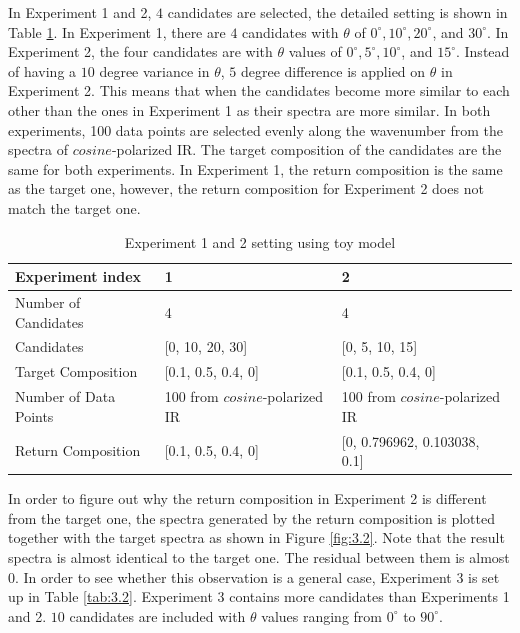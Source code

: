In Experiment 1 and 2, $4$ candidates are selected, the detailed setting is shown in Table \ref{tab:3.1}. In Experiment 1, there are $4$ candidates with $\theta$ of $0^{\circ}, 10^{\circ}, 20^{\circ}$, and $30^{\circ}$. In Experiment 2, the four candidates are with $\theta$ values of $0^{\circ}, 5^{\circ}, 10^{\circ}$, and $15^{\circ}$. Instead of having a $10$ degree variance in $\theta$, $5$ degree difference is applied on $\theta$ in Experiment 2. This means that when the candidates become more similar to each other than the ones in Experiment 1 as their spectra are more similar. In both experiments, 100 data points are selected evenly along the wavenumber from the spectra of $cosine$-polarized IR. The target composition of the candidates are the same for both experiments. In Experiment 1, the return composition is the same as the target one, however, the return composition for Experiment 2 does not match the target one. \\

\begin{table} 
\begin{center}
\begin{tabular}{| l | l | l | }
\hline
Experiment index & 1 & 2  \\
\hline
Number of Candidates & 4 & 4  \\
\hline
Candidates & [0, 10, 20, 30] & [0, 5, 10, 15] \\
\hline
Target Composition & [0.1, 0.5, 0.4, 0] & [0.1, 0.5, 0.4, 0]     \\
\hline
Number of Data Points & 100 from $cosine$-polarized IR &  100 from $cosine$-polarized IR     \\
\hline
Return Composition & [0.1, 0.5, 0.4, 0] & [0, 0.796962, 0.103038, 0.1] \\
\hline
\end{tabular} 
\end{center}
\caption{Experiment 1 and 2 setting using toy model}
\label{tab:3.1}
\end{table}	

In order to figure out why the return composition in Experiment 2 is different from the target one, the spectra generated by the return composition is plotted together with the target spectra as shown in Figure \ref{fig:3.2}. Note that the result spectra is almost identical to the target one. The residual between them is almost $0$. In order to see whether this observation is a general case, Experiment 3 is set up in Table \ref{tab:3.2}. Experiment 3 contains more candidates than Experiments 1 and 2. $10$ candidates are included with $\theta$ values ranging from $0^{\circ}$ to $90^{\circ}$.  \\

